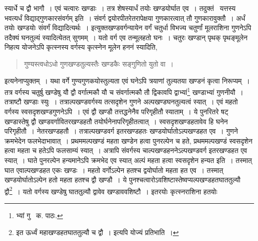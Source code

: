 \documentclass[11pt, openany]{book}
\begin{document}
\newpage

\noindent स्यार्धे च द्वौ भागौ~। एवं चत्वारः खण्डाः~। तत्र शेषस्यार्धं तयोः खण्डयोर्घात एव~। तदुक्तं \textendash\ यत्तस्य भवत्यर्धं विद्याद्गुणकारसंवर्गम् इति~। संवर्ग द्वयोरपीतरेतरापेक्षया गुणकारत्वात् तौ गुणकारावुक्तौ~। अर्धं तयोः खण्डयोः संवर्गं विद्यादित्यर्थः~। इत्युक्तखण्डवर्गन्यायेन वर्गं चतुर्धा विभज्य चतुर्णां मूलराशिना गुणनेऽपि तदैक्यं घनतुल्यं स्यादित्येतत् सुगमम्~। यतो वर्ग एव तन्मूलहतो घनः~। चतुरः खण्डान् पृथक् पृथङ्मूलेन निहत्य योजनेऽपि कृत्स्नस्य वर्गस्य कृत्स्नेन मूलेन हननं स्यादिति,

\begin{quote}
{\qt गुण्यस्त्वधोऽधो गुणखण्डतुल्यस्तैः खण्डकैः सङ्गुणितो युतो वा~।}
\end{quote}

\noindent इत्यनेनाप्युक्तम्~। यथा वर्गे गुण्यगुणकयोस्तुल्यता एवं घनेऽपि त्रयाणां तुल्यतया खण्डनं कृत्वा निरूप्यम्~। तत्र वर्गस्य चतुर्षु खण्डेषु यौ द्वौ वर्गात्मकौ यौ च संवर्गात्मकौ तौ द्विकावपि द्वाभ्यां\renewcommand{\thefootnote}{१}\footnote{भ्यां गु \textendash\ क. पाठः.} खण्डाभ्यां गुणनीयौ~। तत्राष्टौ खण्डाः स्युः~। तत्राल्पखण्डवर्गस्य तत्सदृशेन गुणने अल्पखण्डघनतुल्यत्वं स्यात्~। एवं महतो वर्गस्य स्वसदृशखण्डगुणनेऽपि~। एवं द्वौ खण्डौ तत्तद्धनेनैव परिगृहीतौ स्याताम्~। ये पुनरितरे षट् खण्डास्तेषु द्वौ खण्डवर्गावितरखण्डहतौ तयोर्घनेनापरिगृहीतत्वात्~। स्वसदृशखण्डहतावेव हि घनेन परिगृहीतौ~। नेतरखण्डहतौ~। तत्राल्पखण्डवर्ग इतरखण्डहतः खण्डयोर्घातोऽल्पखण्डहत एव~। गुणने क्रमभेदेन फलभेदाभावात्~। प्रथममल्पखण्डं महता खण्डेन हत्वा पुनरल्पेन च हते, प्रथममल्पखण्डं स्वसदृशेन हत्वा महता च हतेऽपि फलसाम्यं स्यात्~। अत्रापि संवर्गस्य चाल्पखण्डहननेऽल्पखण्डवर्ग इतरखण्डहत एव स्यात्~। घाते पुनरल्पेन हन्यमानेऽपि क्रमभेद एव स्यात् अल्पं महता हत्वा स्वसदृशेन हन्यत इति~। तस्मात् घात एवाल्पखण्डहत एकः खण्डः~। महतो वर्गोऽल्पेन हतश्च द्वयोर्घातो महता हत एव~। तस्मात् खण्डयोर्घातोऽल्पेन हतो महता हतश्च द्वौ खण्डौ~। ये पुनश्चत्वारोऽवशिष्टास्तेष्वप्यल्पखण्डहतघाततुल्यौ द्वौ\renewcommand{\thefootnote}{*}\footnote{इत ऊर्ध्वं महाखण्डहतघाततुल्यौ च द्वौ~। इत्यपि योज्यं प्रतिभाति~।}~। यतो वर्गस्य खण्डेषु घाततुल्यौ द्वावेव खण्डाववशिष्टौ~। इतरयोः कृत्स्नराशिना हतयोः 

\newpage
\end{document}
